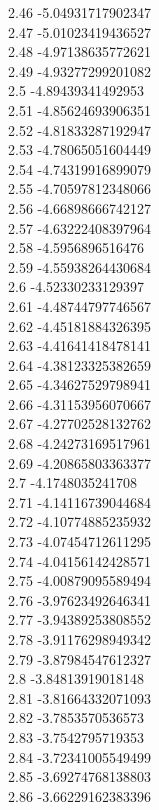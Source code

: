 {2.46	-5.04931717902347\\
2.47	-5.01023419436527\\
2.48	-4.97138635772621\\
2.49	-4.93277299201082\\
2.5	-4.89439341492953\\
2.51	-4.85624693906351\\
2.52	-4.81833287192947\\
2.53	-4.78065051604449\\
2.54	-4.74319916899079\\
2.55	-4.70597812348066\\
2.56	-4.66898666742127\\
2.57	-4.63222408397964\\
2.58	-4.5956896516476\\
2.59	-4.55938264430684\\
2.6	-4.52330233129397\\
2.61	-4.48744797746567\\
2.62	-4.45181884326395\\
2.63	-4.41641418478141\\
2.64	-4.38123325382659\\
2.65	-4.34627529798941\\
2.66	-4.31153956070667\\
2.67	-4.27702528132762\\
2.68	-4.24273169517961\\
2.69	-4.20865803363377\\
2.7	-4.1748035241708\\
2.71	-4.14116739044684\\
2.72	-4.10774885235932\\
2.73	-4.07454712611295\\
2.74	-4.04156142428571\\
2.75	-4.00879095589494\\
2.76	-3.97623492646341\\
2.77	-3.94389253808552\\
2.78	-3.91176298949342\\
2.79	-3.87984547612327\\
2.8	-3.84813919018148\\
2.81	-3.81664332071093\\
2.82	-3.7853570536573\\
2.83	-3.7542795719353\\
2.84	-3.72341005549499\\
2.85	-3.69274768138803\\
2.86	-3.66229162383396\\
}

